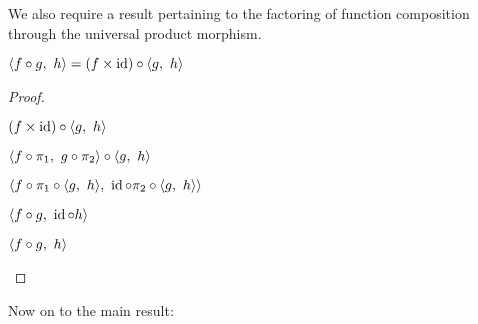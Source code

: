 We also require a result pertaining to the factoring of function composition through the universal product morphism.

\begin{lemma}\label{lemma:prod-comp-factor}
  $\langle f\circ g,~h\rangle = (f\times\operatorname{id})\circ\langle g,~h\rangle$
  \begin{proof}
    \begin{itemize}
      \step
        $(f\times\operatorname{id})\circ\langle g,~h\rangle$

      \step[=]
        $\langle f\circ\pi_1,~g\circ\pi_2\rangle\circ\langle g,~h\rangle$
        \marginnote{\Def-$\times$}

      \step[=]
        $\langle f\circ\pi_1\circ\langle g,~h\rangle,~\operatorname{id}\circ\pi_2\circ\langle g,~h\rangle\rangle$

      \step[=]
        $\langle f\circ g,~\operatorname{id}\circ h\rangle$

      \step[=]
        $\langle f\circ g,~h\rangle$
        \qedhere
        \marginnote{\Def-$\id$}
    \end{itemize}
  \end{proof}
\end{lemma}

Now on to the main result:

